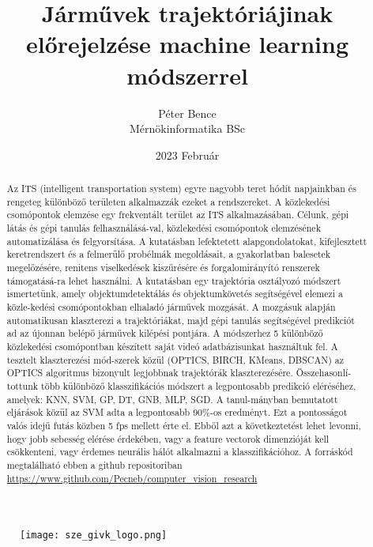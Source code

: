 \documentclass{article}
\title{Járművek trajektóriájinak előrejelzése machine learning módszerrel}
\author{Péter Bence\\Mérnökinformatika BSc}
\date{2023 Február}
\begin{document}
    
    \begin{titlepage}
        \maketitle
        \begin{figure}[H]\centering
            \texttt{[image: sze\_givk\_logo.png]}
        \end{figure}
    \end{titlepage}
    \begin{abstract}
        Az ITS (intelligent transportation system) egyre nagyobb teret 
        hódít napjainkban és rengeteg különböző területen alkalmazzák 
        ezeket a rendszereket. A közlekedési csomópontok elemzése egy 
        frekventált terület az ITS alkalmazásában.
        Célunk, gépi látás és gépi tanulás felhasználásá-val, közlekedési
        csomópontok elemzésének automatizálása és felgyorsítása. A kutatásban
        lefektetett alapgondolatokat, kifejlesztett keretrendszert és 
        a felmerülő probélmák megoldásait, a gyakorlatban balesetek megelőzésére,
        renitens viselkedések kiszűrésére és forgalomirányító renszerek támogatásá-ra
        lehet használni.  
        A kutatásban egy trajektória osztályozó módszert ismertetünk, amely objektumdetektálás 
        és objektumkövetés segítségével elemezi a közle-kedési 
        csomópontokban elhaladó járművek mozgását. A mozgásuk alapján 
        automatikusan klaszterezi a trajektóriákat, majd gépi tanulás 
        segítségével predikciót ad az újonnan belépő járművek kilépési 
        pontjára. A módszerhez 5 különböző közlekedési csomópontban 
        készített saját videó adatbázisunkat használtuk fel.
        A tesztelt klaszterezési mód-szerek közül (OPTICS, BIRCH, KMeans, DBSCAN)
        az OPTICS algoritmus bizonyult legjobbnak trajektórák klaszterezésére.
        Összehasonlí-tottunk több különböző klasszifikációs módszert 
        a legpontosabb predikció eléréséhez, amelyek: KNN, SVM, GP, DT, 
        GNB, MLP, SGD. A tanul-mányban bemutatott eljárások közül az 
        SVM adta a legpontosabb 90\%-os eredményt.
        Ezt a pontosságot valós idejű futás közben 5 fps mellett érte el.
        Ebből azt a következtetést lehet levonni, hogy jobb sebesség elérése
        érdekében, vagy a feature vectorok dimenzióját kell csökkenteni, vagy
        érdemes neurális hálót alkalmazni a klasszifikációhoz.
        A forráskód megtalálható ebben a github repositoriban 
        \url{https://www.github.com/Pecneb/computer_vision_research}
        

\end{abstract}
\end{document}
